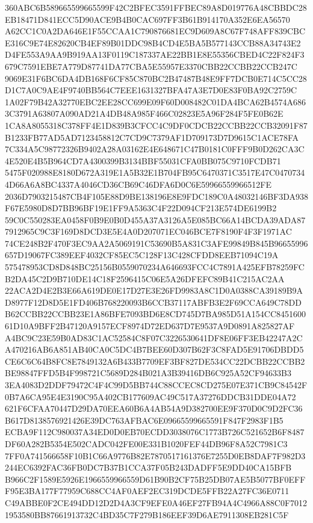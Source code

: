 \documentclass[UTF8,fontset=fandol,zihao=-4,a4paper]{ctexart}
\begin{document}
{{360ABC6B589665599665599F42C2BFEC3591FFBEC89A8D019776A48CBBDC28EB18471D841ECC5D90ACE9B4B0CAC697FF3B61B914170A352E6EA56570
A62CC1C0A2DA646E1F55CCAA1C790876681EC9D609A8C67F748AFF839CBCE316C9E74E82620CB4EF89B01DDC98B4CD4E5BA5B577143CCB88A34743E2
D4FE553A9AA9B919AA13F0119C187337AE22BB1E8E55356CBED4C22F824F3679C7591EBE7A779D87741DA77CBA5E55957E3370CBB22CCBB22CCB247C
9069E31F6BC6DA4DB168F6CF85C870BC2B47487B48E9FF7DCB0E714C5CC28D1C7A0C9AE4F9740BB564C7EEE1631327BFA47A3E7D0E83F0BA92C2759C
1A02F79B42A32770EBC2EE28CC699E09F60D008482C01DA4BCA62B4574A6863C3791A63807A090AD21A4DB48A985F466C02823E5A96F284F5FE0B62E
1CA8A8055318C378FF4E1D839B3CFCC4C9DF0CDCB22CCBB22CCB32091F87B1233FB77AD5AD7123458812C7CD9C7379AF1D709173D7D9615C1ACE78FA
7C334A5C98772326B9402A28A03162E4E648671C47B0181C0FFF9B0D262CA3C4E520E4B5B964CD7A4300399B3134BBF55031CFA0BB075C9710FCDB71
5475F020988E8180D672A319E1A5B32E1B704FB95C6470371C3517E47C04707344D66A6A8BC4337A4046CD36CB69C46DFA6D0C6E59966559966512FE
2036D7903215487CB4F105E88D9BE138196E8E9FDC189C0A48032146BF3DA938F67E5980D8D7BB96BF19E1FF9A5363C4F22D094CF213E574DE6199B2
59C0C550283EA0458F0B9E0B0D455A37A3126A5E085BC66A14BCDA39ADA877912965C9C3F169D8DCD3E5E4A0D207071EC046BCE7F8190F4F3F1971AC
74CE248B2F470F3EC9AA2A5069191C53690B5A831C3AFE99849B845B96655996657D19067FC389EEF4032CF85EC5C128F13C428CFDD8EEB71094C19A
575478953CD8D848BC25156B0559070234A646693FCC4C7891A425EFB78259FCB2DA45C2D9B710DE14C18F2596415C06E5A26DFEFC89B41C215AC2AA
22ACA2D4E2B3E66A619DE0E17D27E3E26FD9983A8C1D0A0388CA39189B9AD8977F12D8D5E1FD406B768220093B6CCB37117ABFB3E2F69CCA649C78DD
B62CCBB22CCBB23E1A86BFE7093BD6E8CD745D7BA985D51A154CC845160061D10A9BFF2B47120A9157ECF8974D72ED637D7E9537A9D0891A825827AF
A4BC9C23E59B0AD83C1AC52584C8F07C3226530641DF8E06FF3EB42247A2CA470216AB6A851AB40CA0C5DC4B7BEE60D307B62F3C8FAD5E91706DBDD5
CE6C6C64B8FC8E7849132A6B433B7709EF3BF827DE534CC22DCBB22CCBB2BE98847FFD5B4F998721C5689D284B021A3B39416DB6C925A52CF94633B3
3EA4083D2DDF79472C4F4C99D5BB744C88CCEC8CD275E07E371CB9C84542F0B7A6CA95E4E3190C95A402CB177609AC49C517A37276DDCB31DDE04A72
621F6CFAA70447D29DA70EEA60B6A4AB54A9D382700EE9F370D0C9D2FC36B617D8138576921426E39DC763AFBAC6E09665599665591F847F2983F1B5
ECBA9F112C980037A34ED0D0EB70ECDD3038076C1773B726C521652B6F8487DF60A282B5354E502CADC042FE00E331B1020FEF44DB96F8A52C7981C3
7FF0A741566658F10B1C66A9776B82E7870517161376E7255D0EB8DAF7F982D3244EC6392FAC36FB0DC7B37B1CCA37F05B243DADFF5E9DD40CA15BFB
B966C2F1589E5926E1966559966559D61B90B2CF75B25DB07AE5B5077BF0EFFF95E3BA177F77959C688CC4AF0AEF2EC319DCDE5FFB22A27FC36E0711
C49ABBE0F2CE494DD12D2D4A3CF9EFE0A46EF27FB94A4C4966A88C0F70121953580BB87661913732C4BD35C7F279B186EEF39D6AE7911308EB281C5F
}}
\end{document}
